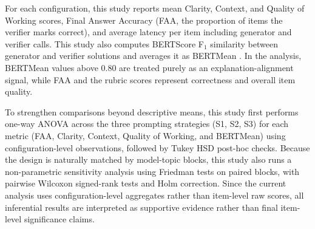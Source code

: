 ﻿\documentclass[a4paper,conference,10pt]{IEEEtran}
\begin{document}
For each configuration, this study reports mean Clarity, Context, and Quality of Working scores, Final Answer Accuracy (FAA, the proportion of items the verifier marks correct), and average latency per item including generator and verifier calls. This study also computes BERTScore F\(_1\) similarity between generator and verifier solutions and averages it as BERTMean \cite{hanna2021finegrained}. In the analysis, BERTMean values above 0.80 are treated purely as an explanation-alignment signal, while FAA and the rubric scores represent correctness and overall item quality.

To strengthen comparisons beyond descriptive means, this study first performs one-way ANOVA across the three prompting strategies (S1, S2, S3) for each metric (FAA, Clarity, Context, Quality of Working, and BERTMean) using configuration-level observations, followed by Tukey HSD post-hoc checks. Because the design is naturally matched by model-topic blocks, this study also runs a non-parametric sensitivity analysis using Friedman tests on paired blocks, with pairwise Wilcoxon signed-rank tests and Holm correction. Since the current analysis uses configuration-level aggregates rather than item-level raw scores, all inferential results are interpreted as supportive evidence rather than final item-level significance claims.
\end{document}
